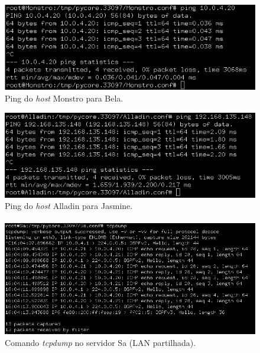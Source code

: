             
    \begin{minipage}{0.5\linewidth}
        \centering
            \begin{figure}[H]
            \includegraphics[width=\linewidth]{prints/Questao5/A-Monstro-Bela.jpg}
            \caption{Ping do \textit{host} Monstro para Bela.} \label{questao5-ping-A}
            \end{figure}
    \end{minipage}
    \begin{minipage}{0.5\linewidth}
        \centering
            \begin{figure}[H]
            \includegraphics[width=\linewidth]{prints/Questao5/B-Alladin-Jasmine.jpg}
            \caption{Ping do \textit{host} Alladin para Jasmine.} \label{questao5-ping-B}
            \end{figure}
    \end{minipage}

    \paragraph{}
    \paragraph{}
    \begin{figure}[H]
    \centering
    \includegraphics[width=400pt]{prints/Questao5/A-Sa.jpg}
    \caption{Comando \textit{tcpdump} no servidor Sa (LAN partilhada).} \label{questao5-tcpdump-A}
    \end{figure}
    
